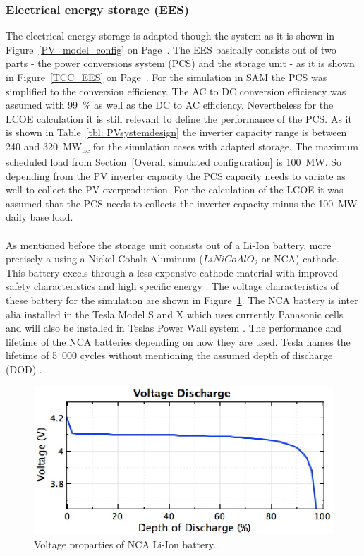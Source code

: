\documentclass[Master,MEE,english]{twbook}%
\begin{document}
\subsubsection{Electrical energy storage (EES)}
The electrical energy storage is adapted though the system as it is shown in Figure~\ref{PV_model_config} on Page~\pageref{PV_model_config}. The EES basically consists out of two parts - the power conversions system (PCS) and the storage unit - as it is shown in Figure~\ref{TCC_EES} on Page~\pageref{TCC_EES}. For the simulation in SAM the PCS was simplified to the conversion efficiency. The AC to DC conversion efficiency was assumed with 99~\% as well as the DC to AC efficiency. Nevertheless for the LCOE calculation it is still relevant to define the performance of the PCS. As it is shown in Table~\ref{tbl: PVsystemdesign} the inverter capacity range is between 240 and 320~MW\textsubscript{ac} for the simulation cases with adapted storage. The maximum scheduled load from Section~\ref{Overall simulated configuration} is 100~MW. So depending from the PV inverter capacity the PCS capacity needs to variate as well to collect the  PV-overproduction. For the calculation of the LCOE it was assumed that the PCS needs to collects the inverter capacity minus the 100~MW daily base load.\\
\\
As mentioned before the storage unit consists out of a Li-Ion battery, more precisely a using a Nickel Cobalt Aluminum ($LiNiCoAlO_2$  or NCA) cathode. This battery excels through a less expensive cathode material with improved safety characteristics and high specific energy \cite{NREL2015a}. The voltage characteristics of these battery for the simulation are shown in Figure~\ref{EES_VoltageDischarge}. The NCA battery is inter alia installed in the Tesla Model S and X \cite{Nykvist2015} which uses currently Panasonic cells and will also be installed in Teslas Power Wall system \cite{Shahan2015}. The performance and lifetime of the NCA batteries depending on how they are used. Tesla names the lifetime of 5~000 cycles without mentioning the assumed depth of discharge (DOD) \cite{Shahan2015}.\\
\begin{figure}[!htbp]  
\centering
\includegraphics[width=0.6\linewidth]{FIG/EES_VoltageDischarge}
\caption[Voltage proparties of NCA Li-Ion battery.]{Voltage proparties of NCA Li-Ion battery..}\label{EES_VoltageDischarge}
\end{figure}\\
\end{document}
